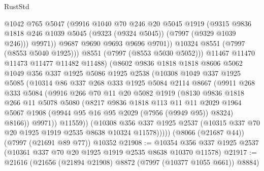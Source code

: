 \begin{lexlean}{RustStd}
\begin{coremodule}
                    @1042
                    @765
                    @5047
                    (@9916
                      @1040
                      @70
                      @246
                      @20
                      @5045
                      @1919
                      (@9315
                        @9836
                        @1818
                        @246
                        @1039
                        @5045
                        (@9323 (@9324 @5045))
                        (@7997 (@9329 @1039 @246)))
                      @9971))
                  @9687
                  @9690
                  @9693
                  @9696
                  @9701))
              @10324
              @8551
              (@7997 (@8553 @5040 @1925)))
            @8551
            (@7997 (@8553 @5030 @5052)))
          @11467
          @11470
          @11473
          @11477
          @11482
          @11488)
        (@8602
          @9836
          @1818
          @1818
          @8606
          @5062
          @1049
          @356
          @337
          @1925
          @5086
          @1925
          @2538
          (@10308
            @1049
            @337
            @1925
            @5085
            (@10314
              @86
              @337
              @268
              @333
              @1925
              @5084
              @2114
              @8667
              (@9911
                @268
                @333
                @5084
                (@9916
                  @266
                  @70
                  @11
                  @20
                  @5082
                  @1919
                  (@8130
                    @9836
                    @1818
                    @266
                    @11
                    @5078
                    @5080
                    (@8217
                      @9836
                      @1818
                      @113
                      @11
                      @11
                      @2029
                      @1964
                      @5067
                      @1908
                      (@9944 @95 @16 @95 @2029 (@7956 (@9949 @95)) @8324)
                      @8166))
                  @9971))
              @11559))
          (@10308
            @356
            @337
            @1925
            @2537
            (@10315 @337 @70 @20 @1925 @1919 @2535 @8638 @10324 @11578)))))
    (@8066 (@21687 @44))
    (@7997 (@21691 @89 @77))
    @10352
@21908 := @10354 @356 @337 @1925 @2537 (@10361 @337 @70 @20 @1925 @1919 @2535 @8638 @10370 @11578)
@21917 := @21616 (@21656 (@21894 @21908) @8872 (@7997 (@10377 @1055 @661)) @8884)

\end{coremodule}
\end{lexlean}
